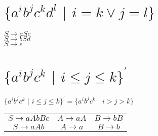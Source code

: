 \documentclass[11pt,letterpaper]{article}
\begin{document}
\section{$\{a^i b^j c^k d^l$ $|$ $i=k \vee j=l\}$}

\begin{center}
    $S \rightarrow aSc$ \\
    $S \rightarrow bSd$ \\
    $S \rightarrow \epsilon$
\end{center}

\section{$\{a^i b^j c^k$ $|$ $i \leq j \leq k\}^{'}$}
\begin{center}
$\{a^i b^j c^k$ $|$ $i \leq j \leq k\}^{'} = \{a^i b^j c^k$ $|$ $i > j > k\}$ \\
\end{center}
\begin{table}[!h]
    \centering
    \begin{tabular}{c c c}
    $S \rightarrow aAbBc$ & $A \rightarrow aA$ & $B \rightarrow bB$ \\
    $S \rightarrow aAb$ & $A \rightarrow a$ & $B \rightarrow b$
    \end{tabular}
    \label{tab:5}
\end{table}
\end{document}
